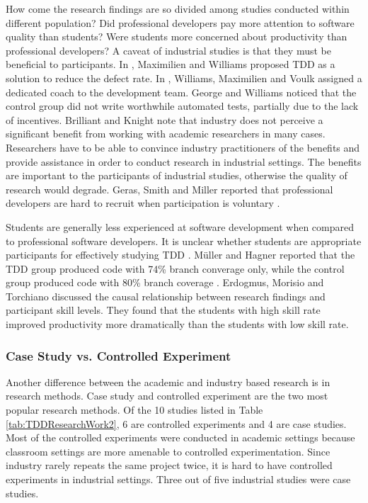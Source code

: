 How come the research findings are so divided among studies 
conducted within different population? Did professional 
developers pay more attention to software quality than 
students? Were students more concerned about productivity
than professional developers?  A caveat of industrial studies 
is that they must be beneficial to participants. 
In \cite{Maximilien:03}, Maximilien and Williams proposed TDD as 
a solution to reduce the defect rate. In \cite{Williams:03}, Williams,
Maximilien and Voulk assigned a dedicated coach to the development 
team. George and Williams \cite{George:03} noticed that the control 
group did not write worthwhile automated tests, partially due to the 
lack of incentives. Brilliant and Knight \cite{Brilliant:99} note 
that industry does not perceive a significant benefit from working 
with academic researchers in many cases. Researchers have to be able
to convince industry practitioners of the benefits and provide 
assistance in order to conduct research in industrial settings. 
The benefits are important to the participants of industrial studies, 
otherwise the quality of research would degrade. Geras, Smith and 
Miller reported that professional developers are hard to recruit 
when participation is voluntary \cite{Geras:04}. 

Students are generally less experienced at software development 
when compared to professional software developers. It is unclear 
whether students are appropriate participants for effectively
studying TDD \cite{Erdogmus:05}. M\"{u}ller and Hagner reported 
that the TDD group produced code with 74\% branch converage only, while the control 
group produced code with 80\% branch coverage \cite{Muller:02}. 
Erdogmus, Morisio and Torchiano \cite{Erdogmus:05} discussed 
the causal relationship between research findings and participant 
skill levels. They found that the students with high skill rate 
improved productivity more dramatically than the students with 
low skill rate. 

\subsubsection{Case Study vs. Controlled Experiment}
Another difference between the academic and industry based research
is in research methods. Case study and 
controlled experiment are the two most popular research methods. 
Of the 10 studies listed in Table \ref{tab:TDDResearchWork2}, 6 
are controlled experiments and 4 are case studies. Most of the
controlled experiments were conducted in academic settings because
classroom settings are more amenable to controlled experimentation. 
Since industry rarely repeats the same project twice, it is hard to have 
controlled experiments in industrial settings. Three out 
of five industrial studies were case studies. 

